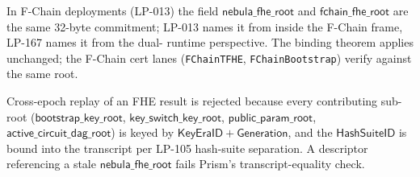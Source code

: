 \begin{remark}
\label{rem:fchain-alias}
In F-Chain deployments (LP-013) the field $\mathsf{nebula\_fhe\_root}$
and $\mathsf{fchain\_fhe\_root}$ are the same 32-byte commitment; LP-013
names it from inside the F-Chain frame, LP-167 names it from the dual-
runtime perspective. The binding theorem applies unchanged; the
F-Chain cert lanes (\texttt{FChainTFHE}, \texttt{FChainBootstrap}) verify
against the same root.
\end{remark}

\begin{remark}
\label{rem:fhe-replay-protection}
Cross-epoch replay of an FHE result is rejected because every contributing
sub-root ($\mathsf{bootstrap\_key\_root}$, $\mathsf{key\_switch\_key\_root}$,
$\mathsf{public\_param\_root}$, $\mathsf{active\_circuit\_dag\_root}$) is
keyed by $\mathsf{KeyEraID} + \mathsf{Generation}$, and the
$\mathsf{HashSuiteID}$ is bound into the transcript per LP-105
hash-suite separation. A descriptor referencing a stale
$\mathsf{nebula\_fhe\_root}$ fails Prism's transcript-equality check.
\end{remark}
